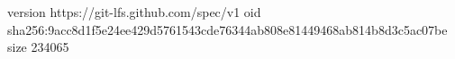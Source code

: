 version https://git-lfs.github.com/spec/v1
oid sha256:9acc8d1f5e24ee429d5761543cde76344ab808e81449468ab814b8d3c5ac07be
size 234065
